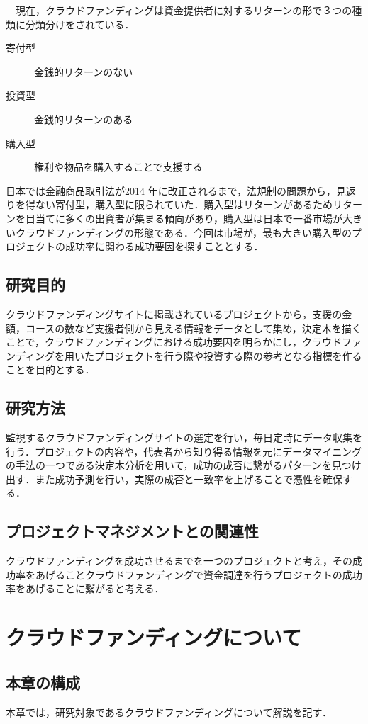 　現在，クラウドファンディングは資金提供者に対するリターンの形で３つの種類に分類分けをされている．
\begin{description}
 \item[寄付型] 金銭的リターンのない
 \item[投資型] 金銭的リターンのある
 \item[購入型] 権利や物品を購入することで支援する
\end{description}
日本では金融商品取引法が2014 年に改正されるまで\cite{kisei}，法規制の問題から，見返りを得ない寄付型，購入型に限られていた．購入型はリターンがあるためリターンを目当てに多くの出資者が集まる傾向があり，購入型は日本で一番市場が大きいクラウドファンディングの形態である．今回は市場が，最も大きい購入型のプロジェクトの成功率に関わる成功要因を探すこととする．

\section{研究目的}
 クラウドファンディングサイトに掲載されているプロジェクトから，支援の金額，コースの数など支援者側から見える情報をデータとして集め，決定木を描くことで，クラウドファンディングにおける成功要因を明らかにし，クラウドファンディングを用いたプロジェクトを行う際や投資する際の参考となる指標を作ることを目的とする．

\section{研究方法}
監視するクラウドファンディングサイトの選定を行い，毎日定時にデータ収集を行う．プロジェクトの内容や，代表者から知り得る情報を元にデータマイニングの手法の一つである決定木分析を用いて，成功の成否に繋がるパターンを見つけ出す．また成功予測を行い，実際の成否と一致率を上げることで憑性を確保する．

\section{プロジェクトマネジメントとの関連性}
クラウドファンディングを成功させるまでを一つのプロジェクトと考え，その成功率をあげることクラウドファンディングで資金調達を行うプロジェクトの成功率をあげることに繋がると考える．
\chapter{クラウドファンディングについて}
\section{本章の構成}
本章では，研究対象であるクラウドファンディングについて解説を記す．

